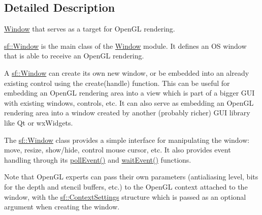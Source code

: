 \subsection{Detailed Description}
\hyperlink{classsf_1_1_window}{Window} that serves as a target for Open\+GL rendering. 

\hyperlink{classsf_1_1_window}{sf\+::\+Window} is the main class of the \hyperlink{classsf_1_1_window}{Window} module. It defines an OS window that is able to receive an Open\+GL rendering.

A \hyperlink{classsf_1_1_window}{sf\+::\+Window} can create its own new window, or be embedded into an already existing control using the create(handle) function. This can be useful for embedding an Open\+GL rendering area into a view which is part of a bigger G\+UI with existing windows, controls, etc. It can also serve as embedding an Open\+GL rendering area into a window created by another (probably richer) G\+UI library like Qt or wx\+Widgets.

The \hyperlink{classsf_1_1_window}{sf\+::\+Window} class provides a simple interface for manipulating the window\+: move, resize, show/hide, control mouse cursor, etc. It also provides event handling through its \hyperlink{classsf_1_1_window_a338e996585faf82e93069858e3b531b7}{poll\+Event()} and \hyperlink{classsf_1_1_window_aaf02ab64fbc1d374eef3696df54137bc}{wait\+Event()} functions.

Note that Open\+GL experts can pass their own parameters (antialiasing level, bits for the depth and stencil buffers, etc.) to the Open\+GL context attached to the window, with the \hyperlink{structsf_1_1_context_settings}{sf\+::\+Context\+Settings} structure which is passed as an optional argument when creating the window.

